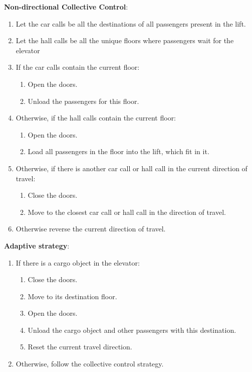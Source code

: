 \textbf{Non-directional Collective Control}:
\begin{enumerate}[noitemsep]
    \item Let the car calls be all the destinations of all passengers present in the lift.
    \item Let the hall calls be all the unique floors where passengers wait for the elevator
    \item If the car calls contain the current floor:
    \begin{enumerate}[noitemsep]
        \item Open the doors.
        \item Unload the passengers for this floor.
    \end{enumerate}
    \item Otherwise, if the hall calls contain the current floor:
    \begin{enumerate}[noitemsep]
        \item Open the doors.
        \item Load all passengers in the floor into the lift, which fit in it.
    \end{enumerate}
    \item Otherwise, if there is another car call or hall call in the current direction of travel:
    \begin{enumerate}[noitemsep]
        \item Close the doors.
        \item Move to the closest car call or hall call in the direction of travel.
    \end{enumerate}
    \item Otherwise reverse the current direction of travel.
\end{enumerate}

\textbf{Adaptive strategy}:
\begin{enumerate}[noitemsep]
    \item If there is a cargo object in the elevator:
    \begin{enumerate}[noitemsep]
        \item Close the doors.
        \item Move to its destination floor.
        \item Open the doors.
        \item Unload the cargo object and other passengers with this destination.
        \item Reset the current travel direction.
    \end{enumerate}
    \item Otherwise, follow the collective control strategy.
\end{enumerate}

